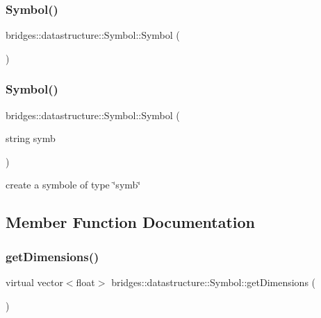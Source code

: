 \subsubsection{\texorpdfstring{Symbol()}{Symbol()}\hspace{0.1cm}{\footnotesize\ttfamily [1/2]}}
{\footnotesize\ttfamily bridges\+::datastructure\+::\+Symbol\+::\+Symbol (\begin{DoxyParamCaption}{ }\end{DoxyParamCaption})\hspace{0.3cm}{\ttfamily [inline]}}

\mbox{\label{classbridges_1_1datastructure_1_1_symbol_adaeede160240bcc959d1813c5cb79528}} 
\subsubsection{\texorpdfstring{Symbol()}{Symbol()}\hspace{0.1cm}{\footnotesize\ttfamily [2/2]}}
{\footnotesize\ttfamily bridges\+::datastructure\+::\+Symbol\+::\+Symbol (\begin{DoxyParamCaption}\item[{string}]{symb }\end{DoxyParamCaption})\hspace{0.3cm}{\ttfamily [inline]}}

create a symbole of type \char`\"{}symb\char`\"{} 

\subsection{Member Function Documentation}
\mbox{\label{classbridges_1_1datastructure_1_1_symbol_a37ba60b6acdd0888677eb8c64a931679}} 
\subsubsection{\texorpdfstring{getDimensions()}{getDimensions()}}
{\footnotesize\ttfamily virtual vector$<$float$>$ bridges\+::datastructure\+::\+Symbol\+::get\+Dimensions (\begin{DoxyParamCaption}{ }\end{DoxyParamCaption})\hspace{0.3cm}{\ttfamily [pure virtual]}}


